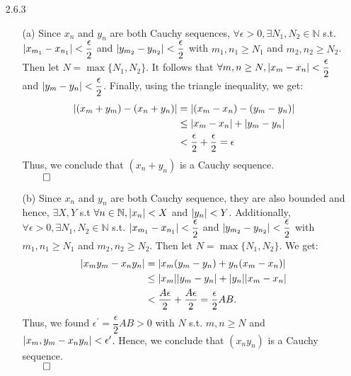 \documentclass[11pt]{article}
\DeclarePairedDelimiter\abs{\lvert}{\rvert}%
\newcommand{\nats}{\mathbb{N}}
\begin{document}
\begin{itemize}
    \item[2.6.3]
        \begin{enumerate}
            \item[(a)]
                Since $x_n$ and $y_n$ are both Cauchy sequences, $\forall
                \epsilon > 0, \exists N_1, N_2 \in \nats$ s.t. $\abs{x_{m_1} -
                x_{n_1}} < \dfrac{\epsilon}{2}$ and $\abs{y_{m_2} - y_{n_2}} <
                \dfrac{\epsilon}{2}$ with $m_1, n_1 \geq N_1$ and $m_2, n_2
                \geq N_2$. Then let $N = \max{\{N_1, N_2\}}$. It follows that
                $\forall m, n \geq N, \abs{x_m - x_n} < \dfrac{\epsilon}{2}$
                and $\abs{y_m - y_n} < \dfrac{\epsilon}{2}$. Finally, using the
                triangle inequality, we get:
                \begin{align*}
                    \abs{(x_m + y_m) - (x_n + y_n)} &=
                    \abs{(x_m - x_n) - (y_m - y_n)}\\
                    &\leq \abs{x_m - x_n} + \abs{y_m - y_n}\\
                    &< \dfrac{\epsilon}{2} + \dfrac{\epsilon}{2} = \epsilon
                \end{align*}
                Thus, we conclude that $(x_n + y_n)$ is a Cauchy sequence.\\
                $\qed$

            \item[(b)]
                Since $x_n$ and $y_n$ are both Cauchy sequence, they are also
                bounded and hence, $\exists X, Y$ s.t  $\forall n \in \nats,
                \abs{x_n} < X$ and $\abs{y_n} < Y$. Additionally, $\forall
                \epsilon > 0, \exists N_1, N_2 \in \nats$ s.t. $\abs{x_{m_1} -
                x_{n_1}} < \dfrac{\epsilon}{2}$ and $\abs{y_{m_2} - y_{n_2}} <
                \dfrac{\epsilon}{2}$ with $m_1, n_1 \geq N_1$ and $m_2, n_2
                \geq N_2$. Then let $N = \max{\{N_1, N_2\}}$. We get:
                \begin{align*}
                    \abs{x_my_m - x_ny_n} &=
                    \abs{x_m(y_m - y_n) + y_n(x_m - x_n)}\\
                    &\leq \abs{x_m}\abs{y_m - y_n} +
                    \abs{y_n}\abs{x_m - x_n}\\
                    &< \dfrac{A\epsilon}{2} + \dfrac{A\epsilon}{2} =
                    \dfrac{\epsilon}{2}AB.
                \end{align*}
                Thus, we found $\epsilon^{\prime} = \dfrac{\epsilon}{2}AB > 0$
                with $N$ s.t. $m, n \geq N$ and $\abs{x_m, y_m - x_ny_n} <
                \epsilon^\prime$.  Hence, we conclude that $(x_ny_n)$ is a
                Cauchy sequence.\\
                $\qed$
        \end{enumerate}


\end{itemize}
\end{document}
